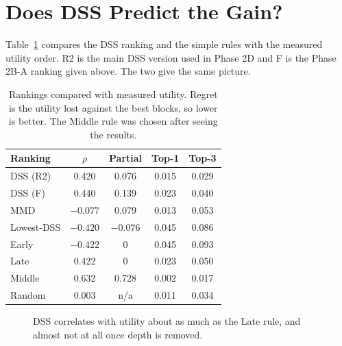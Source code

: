 \documentclass[11pt,a4paper]{report}
\begin{document}
\section{Does DSS Predict the Gain?}

Table~\ref{tab:selectors} compares the DSS ranking and the simple rules with the measured utility order. R2 is the main DSS version used in Phase 2D and F is the Phase 2B-A ranking given above. The two give the same picture.

\begin{table}[t]
\centering
\caption{Rankings compared with measured utility. Regret is the utility lost against the best blocks, so lower is better. The Middle rule was chosen after seeing the results.}
\label{tab:selectors}
\small
\setlength{\tabcolsep}{3.5pt}
\begin{tabular}{@{}lcccc@{}}
\toprule
\textbf{Ranking} & \textbf{$\rho$} & \textbf{Partial} & \textbf{Top-1} & \textbf{Top-3} \\
\midrule
DSS (R2) & 0.420 & 0.076 & 0.015 & 0.029 \\
DSS (F) & 0.440 & 0.139 & 0.023 & 0.040 \\
MMD & $-0.077$ & 0.079 & 0.013 & 0.053 \\
Lowest-DSS & $-0.420$ & $-0.076$ & 0.045 & 0.086 \\
Early & $-0.422$ & 0 & 0.045 & 0.093 \\
Late & 0.422 & 0 & 0.023 & 0.050 \\
Middle & 0.632 & 0.728 & 0.002 & 0.017 \\
Random & 0.003 & n/a & 0.011 & 0.034 \\
\bottomrule
\end{tabular}
\end{table}

\begin{figure}[t]
\centering
{}
\caption{DSS correlates with utility about as much as the Late rule, and almost not at all once depth is removed.}
\label{fig:corr}
\end{figure}
\end{document}

